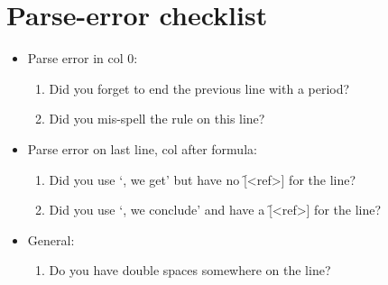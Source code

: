 \documentclass[manual.tex]{subfiles}
\begin{document}
\section{Parse-error checklist}
\begin{itemize}
\item Parse error in col 0:
    \begin{enumerate}[{\bf ?}]
      \item Did you forget to end the previous line with a period?
      \item Did you mis-spell the rule on this line?
    \end{enumerate}
\item Parse error on last line, col after formula:
    \begin{enumerate}[{\bf ?}]
      \item Did you use `, we get' but have no \f{[<ref>]} for the line?
      \item Did you use `, we conclude' and have a \f{[<ref>]} for the line?
    \end{enumerate}
\item General:
    \begin{enumerate}[{\bf ?}]
      \item Do you have double spaces somewhere on the line?
    \end{enumerate}
\end{itemize}
\end{document}
